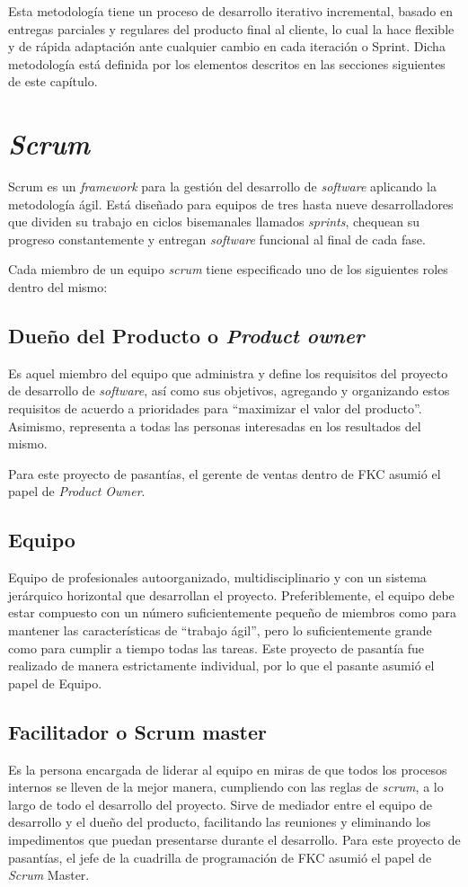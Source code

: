 Esta metodología tiene un proceso de desarrollo iterativo incremental, basado en entregas parciales y regulares del producto final al cliente, lo cual la hace flexible y de rápida adaptación ante cualquier cambio en cada iteración o Sprint. Dicha metodología está definida por los elementos descritos en las secciones siguientes de este capítulo.

\section{\emph{Scrum}}

Scrum es un \emph{framework} para la gestión del desarrollo de \emph{software} aplicando la metodología ágil. Está diseñado para equipos de tres hasta nueve desarrolladores que dividen su trabajo en ciclos bisemanales llamados \emph{sprints}, chequean su progreso constantemente y entregan \emph{software} funcional al final de cada fase\cite{bib:scrum}. 

Cada miembro de un equipo \emph{scrum} tiene especificado uno de los siguientes roles dentro del mismo:

\subsection{Dueño del Producto o \emph{Product owner}}
Es aquel miembro del equipo que administra y define los requisitos del proyecto de desarrollo de \emph{software}, así como sus objetivos, agregando y organizando estos requisitos de acuerdo a prioridades para “maximizar el valor del producto”. Asimismo, representa a todas las personas interesadas en los resultados del mismo.

Para este proyecto de pasantías, el gerente de ventas dentro de \gls{FKC} asumió el papel de \emph{Product Owner}.

\subsection{Equipo}
Equipo de profesionales autoorganizado, multidisciplinario y con un sistema jerárquico horizontal que desarrollan el proyecto. Preferiblemente, el equipo debe estar compuesto con un número suficientemente pequeño de miembros como para mantener las características de “trabajo ágil”, pero lo suficientemente grande como para cumplir a tiempo todas las tareas.
Este proyecto de pasantía fue realizado de manera estrictamente individual, por lo que el pasante asumió el papel de Equipo.

\subsection{Facilitador o Scrum master}
Es la persona encargada de liderar al equipo en miras de que todos los procesos internos se lleven de la mejor manera, cumpliendo con las reglas de \emph{scrum}, a lo largo de todo el desarrollo del proyecto. Sirve de mediador entre el equipo de desarrollo y el dueño del producto, facilitando las reuniones y eliminando los impedimentos que puedan presentarse durante el desarrollo.
Para este proyecto de pasantías, el jefe de la cuadrilla de programación de \gls{FKC} asumió el papel de \emph{Scrum} Master.


